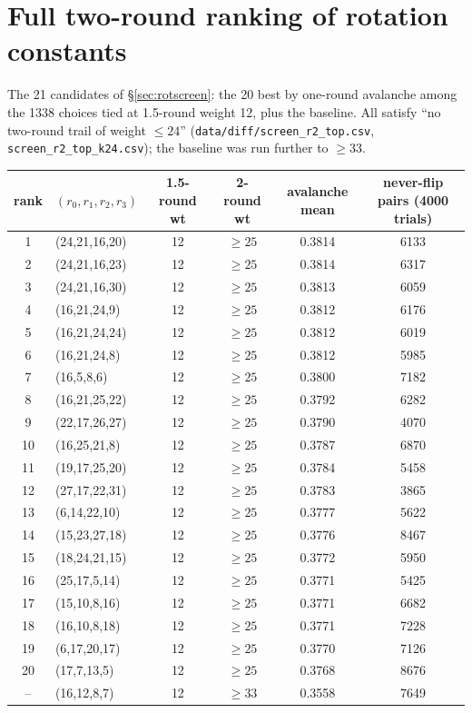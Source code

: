 \documentclass{iacrtrans}
\newcommand{\WuncTwo}{33}    %
\begin{document}
\section{Full two-round ranking of rotation constants}
\label{app:ranking}
The 21 candidates of \S\ref{sec:rotscreen}: the 20 best by one-round avalanche among the 1338 choices tied at 1.5-round weight 12, plus the baseline. All satisfy ``no two-round trail of weight $\leq 24$'' (\texttt{data/diff/screen\_r2\_top.csv}, \texttt{screen\_r2\_top\_k24.csv}); the baseline was run further to $\geq \WuncTwo$.

\begin{center}\footnotesize
\begin{tabular}{clcccc}
\toprule
rank & $(r_0,r_1,r_2,r_3)$ & 1.5-round wt & 2-round wt & avalanche mean & never-flip pairs (4000 trials)\\
\midrule
1 & (24,21,16,20) & 12 & $\geq 25$ & 0.3814 & 6133\\
2 & (24,21,16,23) & 12 & $\geq 25$ & 0.3814 & 6317\\
3 & (24,21,16,30) & 12 & $\geq 25$ & 0.3813 & 6059\\
4 & (16,21,24,9) & 12 & $\geq 25$ & 0.3812 & 6176\\
5 & (16,21,24,24) & 12 & $\geq 25$ & 0.3812 & 6019\\
6 & (16,21,24,8) & 12 & $\geq 25$ & 0.3812 & 5985\\
7 & (16,5,8,6) & 12 & $\geq 25$ & 0.3800 & 7182\\
8 & (16,21,25,22) & 12 & $\geq 25$ & 0.3792 & 6282\\
9 & (22,17,26,27) & 12 & $\geq 25$ & 0.3790 & 4070\\
10 & (16,25,21,8) & 12 & $\geq 25$ & 0.3787 & 6870\\
11 & (19,17,25,20) & 12 & $\geq 25$ & 0.3784 & 5458\\
12 & (27,17,22,31) & 12 & $\geq 25$ & 0.3783 & 3865\\
13 & (6,14,22,10) & 12 & $\geq 25$ & 0.3777 & 5622\\
14 & (15,23,27,18) & 12 & $\geq 25$ & 0.3776 & 8467\\
15 & (18,24,21,15) & 12 & $\geq 25$ & 0.3772 & 5950\\
16 & (25,17,5,14) & 12 & $\geq 25$ & 0.3771 & 5425\\
17 & (15,10,8,16) & 12 & $\geq 25$ & 0.3771 & 6682\\
18 & (16,10,8,18) & 12 & $\geq 25$ & 0.3771 & 7228\\
19 & (6,17,20,17) & 12 & $\geq 25$ & 0.3770 & 7126\\
20 & (17,7,13,5) & 12 & $\geq 25$ & 0.3768 & 8676\\
-- & (16,12,8,7) & 12 & $\geq \WuncTwo$ & 0.3558 & 7649\\
\bottomrule
\end{tabular}
\end{center}
\end{document}
